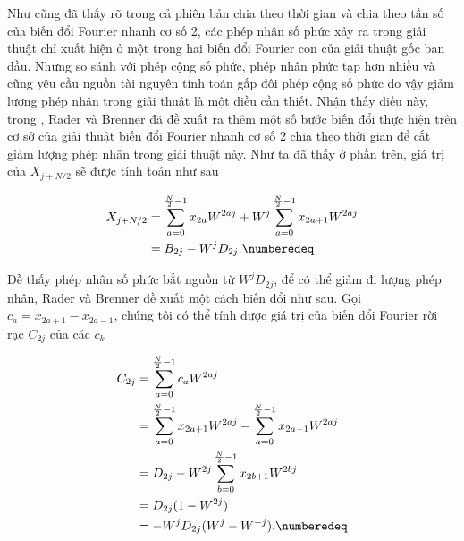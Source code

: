 				
			 Như cũng đã thấy rõ trong cả phiên bản chia theo thời gian và chia theo tần số của biến đổi Fourier nhanh cơ số 2, các phép nhân số phức xảy ra trong giải thuật chỉ xuất hiện ở một trong hai biến đổi Fourier con của giải thuật gốc ban đầu. Nhưng so sánh với phép cộng số phức, phép nhân phức tạp hơn nhiều và cũng yêu cầu nguồn tài nguyên tính toán gấp đôi phép cộng số phức do vậy giảm lượng phép nhân trong giải thuật là một điều cần thiết. Nhận thấy điều này, trong \cite{fft_rader_brenner}, Rader và Brenner đã đề xuất ra thêm một số bước biến đổi thực hiện trên cơ sở của giải thuật biến đổi Fourier nhanh cơ số 2 chia theo thời gian để cắt giảm lượng phép nhân trong giải thuật này. Như ta đã thấy ở phần trên, giá trị của $X_{j + N/2}$ sẽ được tính toán như sau
				
					\begin{align*}
						X_{j + N/2}	& = \sum_{a=0}^{\frac{N}{2} - 1} x_{2a} W^{2aj} + W^j \sum_{a=0}^{\frac{N}{2} - 1} x_{2a + 1} W^{2aj} \\
								& = B_{2j} - W^j D_{2j}. \numberedeq
						\label{fft::rader_brenner_original_formula}
					\end{align*}
				
				Dễ thấy phép nhân số phức bắt nguồn từ $W^j D_{2j}$, để có thể giảm đi lượng phép nhân, Rader và Brenner đề xuất một cách biến đổi như sau. Gọi $c_{a} = x_{2a + 1} - x_{2a - 1}$, chúng tôi có thể tính được giá trị của biến đổi Fourier rời rạc $C_{2j}$ của các $c_k$
				
					\begin{align*}
						C_{2j}	& = \sum_{a=0}^{\frac{N}{2} - 1} c_{a} W^{2aj} \\
								& = \sum_{a=0}^{\frac{N}{2} - 1} x_{2a + 1} W^{2aj} - \sum_{a=0}^{\frac{N}{2} - 1} x_{2a - 1} W^{2aj} \\
								& = D_{2j} - W^{2j} \sum_{b=0}^{\frac{N}{2} - 1} x_{2b + 1} W^{2bj} \\
								& = D_{2j} (1 - W^{2j}) \\
								& = - W^j D_{2j} (W^j - W^{-j}). \numberedeq
						\label{fft::rader_brenner_c_formula}
					\end{align*}
				
